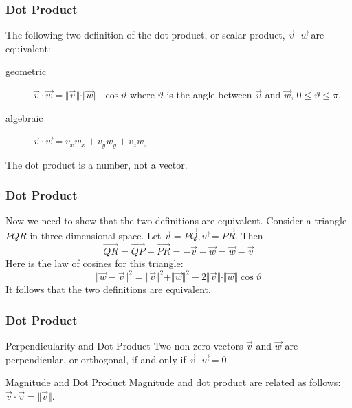 \documentclass[xcolor=dvipsnames]{beamer}
\begin{document}
\begin{frame}
  \frametitle{Dot Product}
  The following two definition of the \alert{dot product}, or
  \alert{scalar product}, $\vec{v}\cdot\vec{w}$ are equivalent:
  \begin{description}
  \item[geometric]
    $\vec{v}\cdot\vec{w}=\Vert\vec{v}\Vert\cdot\Vert\vec{w}\Vert\cdot\cos\vartheta$
    where $\vartheta$ is the angle between $\vec{v}$ and $\vec{w}$,
    $0\leq\vartheta\leq\pi$.
  \item[algebraic] $\vec{v}\cdot\vec{w}=v_{x}w_{x}+v_{y}w_{y}+v_{z}w_{z}$
  \end{description}
The dot product is a number, not a vector.
\end{frame}

\begin{frame}
  \frametitle{Dot Product}
  Now we need to show that the two definitions are equivalent.
  Consider a triangle $PQR$ in three-dimensional space. Let
  $\vec{v}=\vec{PQ},\vec{w}=\vec{PR}$. Then
  \begin{equation}
    \label{eq:oobeipho}
  \vec{QR}=\vec{QP}+\vec{PR}=-\vec{v}+\vec{w}=\vec{w}-\vec{v}  
\end{equation}
Here is the law of cosines for this triangle:
\begin{equation}
  \label{eq:aiwahzoa}
  \Vert\vec{w}-\vec{v}\Vert^{2}=\Vert\vec{v}\Vert^{2}+\Vert\vec{w}\Vert^{2}-2\Vert\vec{v}\Vert\cdot\Vert\vec{w}\Vert\cos\vartheta
\end{equation}
It follows that the two definitions are equivalent.
\end{frame}

\begin{frame}
  \frametitle{Dot Product}
\begin{block}{Perpendicularity and Dot Product}
  Two non-zero vectors $\vec{v}$ and $\vec{w}$ are perpendicular, or
  orthogonal, if and only if $\vec{v}\cdot\vec{w}=0$.
\end{block}

\bigskip

\begin{block}{Magnitude and Dot Product}
  Magnitude and dot product are related as follows: $\vec{v}\cdot\vec{v}=\Vert\vec{v}\Vert$.
\end{block}
\end{frame}
\end{document}
